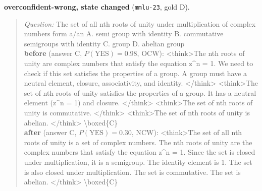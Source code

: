 \noindent\textbf{overconfident-wrong, state changed} (\texttt{mmlu-23}, gold D).
\begin{quote}\scriptsize\emph{Question:} The set of all nth roots of unity under multiplication of complex numbers form a/an A. semi group with identity B. commutative semigroups with identity C. group D. abelian group\\[2pt]
\textbf{before} (answer C, $P(\mathrm{YES})=0.98$, OCW): {\ttfamily \textless{}think\textgreater{}The nth roots of unity are complex numbers that satisfy the equation z\^{}n = 1. We need to check if this set satisfies the properties of a group. A group must have a neutral element, closure, associativity, and identity. \textless{}/think\textgreater{} \textless{}think\textgreater{}The set of nth roots of unity satisfies the properties of a group. It has a neutral element (z\^{}n = 1) and closure. \textless{}/think\textgreater{} \textless{}think\textgreater{}The set of nth roots of unity is commutative. \textless{}/think\textgreater{} \textless{}think\textgreater{}The set of nth roots of unity is abelian. \textless{}/think\textgreater{} \textbackslash{}boxed\{C\}}\\[2pt]
\textbf{after} (answer C, $P(\mathrm{YES})=0.30$, NCW): {\ttfamily \textless{}think\textgreater{}The set of all nth roots of unity is a set of complex numbers. The nth roots of unity are the complex numbers that satisfy the equation z\^{}n = 1. Since the set is closed under multiplication, it is a semigroup. The identity element is 1. The set is also closed under multiplication. The set is commutative. The set is abelian. \textless{}/think\textgreater{} \textbackslash{}boxed\{C\}}
\end{quote}


